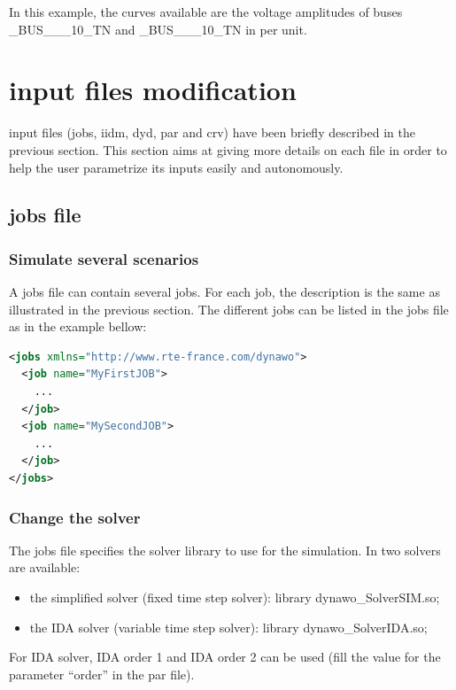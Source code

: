 \documentclass[a4paper, 12pt]{report}
\begin{document}
In this example, the curves available are the voltage amplitudes of buses \_BUS\_\_\_10\_TN and \_BUS\_\_\_10\_TN in per unit.

\section[Dynawo input files modification]{\Dynawo input files modification}

\Dynawo input files (jobs, iidm, dyd, par and crv) have been briefly described in the previous section. This section aims at giving more details on each file in order to help the user parametrize its inputs easily and autonomously.

\subsection{jobs file}

\subsubsection{Simulate several scenarios}

A jobs file can contain several jobs. For each job, the description is the same as illustrated in the previous section. The different jobs can be listed in the jobs file as in the example bellow:

\begin{lstlisting}[language=XML, morekeywords={name}]
<jobs xmlns="http://www.rte-france.com/dynawo">
  <job name="MyFirstJOB">
    ...
  </job>
  <job name="MySecondJOB">
    ...
  </job>
</jobs>
\end{lstlisting}

\subsubsection{Change the solver}

The jobs file specifies the solver library to use for the simulation. In \Dynawo two solvers are available:
\begin{itemize}
\item the simplified solver (fixed time step solver): library dynawo\_SolverSIM.so;
\item the IDA solver (variable time step solver): library dynawo\_SolverIDA.so;
\end{itemize}

For IDA solver, IDA order 1 and IDA order 2 can be used (fill the value for the parameter ``order'' in the par file).
\end{document}
